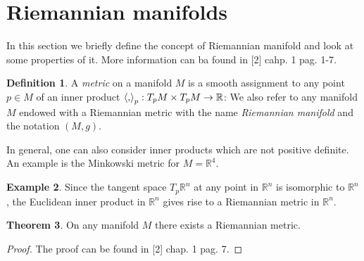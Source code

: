 \documentclass[12pt,a4paper]{report}
\theoremstyle{definition}
\newtheorem{Def}{Definition}[chapter]
\theoremstyle{Theorem}
\newtheorem{Theo}[Def]{Theorem}
\theoremstyle{definition}
\newtheorem{Ex}[Def]{Example}
\theoremstyle{definition}
\begin{document}
	\section{Riemannian manifolds}
	In this section we briefly define the concept of Riemannian manifold and look at some properties of it. More information can ba found in [2] cahp. 1 pag. 1-7.
	\begin{Def}
		A \textit{metric} on a manifold $M$ is a smooth assignment to any point $p\in M$ of an inner product $\braket{,}_p:T_pM\times T_pM\rightarrow \mathbb{R}$:
		We also refer to any manifold $M$ endowed with a Riemannian metric with the name \textit{Riemannian manifold} and the notation $(M,g)$.
	\end{Def}
	In general, one can also consider inner products which are not positive definite. An example is the Minkowski metric for $M=\mathbb{R}^4$.
	\begin{Ex}
		Since the tangent space $T_p\mathbb{R}^n$ at any point in $\mathbb{R}^n$ is isomorphic to $\mathbb{R}^n$, the Euclidean inner product in $\mathbb{R}^n$ gives rise to a Riemannian metric in $\mathbb{R}^n$.		
	\end{Ex}
	\begin{Theo}
		On any manifold $M$ there exists a Riemannian metric.
	\end{Theo}
	\begin{proof}
		The proof can be found in [2] chap. 1 pag. 7.
	\end{proof}
\end{document}
